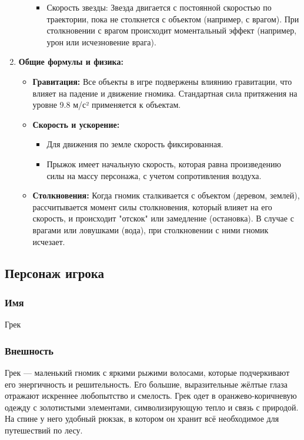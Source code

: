 \documentclass{article}
\begin{document}
\begin{enumerate}
\begin{itemize}
\begin{itemize}
        \item Скорость звезды: Звезда двигается с постоянной скоростью по траектории, пока не столкнется с объектом (например, с врагом). При столкновении с врагом происходит моментальный эффект (например, урон или исчезновение врага).
    \end{itemize}
  \end{itemize}
  \item \textbf{Общие формулы и физика:}
  \begin{itemize}
    \item \textbf{Гравитация:} Все объекты в игре подвержены влиянию гравитации, что влияет на падение и движение гномика. Стандартная сила притяжения на уровне 9.8 м/с² применяется к объектам.
    \item \textbf{Скорость и ускорение:}
    \begin{itemize}
      \item Для движения по земле скорость фиксированная.
      \item Прыжок имеет начальную скорость, которая равна произведению силы на массу персонажа, с учетом сопротивления воздуха.
    \end{itemize}
    \item \textbf{Столкновения:} Когда гномик сталкивается с объектом (деревом, землей), рассчитывается момент силы столкновения, который влияет на его скорость, и происходит "отскок" или замедление (остановка). В случае с врагами или ловушками (вода), при столкновении с ними гномик исчезает.
    
  \end{itemize}  
\end{enumerate}

\subsection{Персонаж игрока}

\subsubsection{Имя} 
Грек

\subsubsection{Внешность} 
Грек — маленький гномик с яркими рыжими волосами, которые подчеркивают его энергичность и решительность. Его большие, выразительные жёлтые глаза отражают искреннее любопытство и смелость. Грек одет в оранжево-коричневую одежду с золотистыми элементами, символизирующую тепло и связь с природой. На спине у него удобный рюкзак, в котором он хранит всё необходимое для путешествий по лесу.
\end{document}
